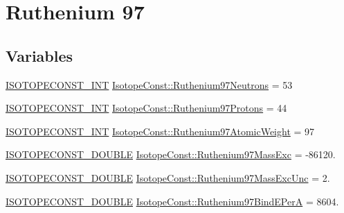 \hypertarget{group___isotope_const-_ruthenium-_ru97}{}\section{Ruthenium 97}
\label{group___isotope_const-_ruthenium-_ru97}
\subsection*{Variables}
\begin{DoxyCompactItemize}
\item 
\mbox{\hyperlink{group___isotope_const-_macros_ga5f18360b3e99483a35c32d789e62621c}{I\+S\+O\+T\+O\+P\+E\+C\+O\+N\+S\+T\+\_\+\+I\+NT}} \mbox{\hyperlink{group___isotope_const-_ruthenium-_ru97_gacc95b6599f6ca56bff7f4cbfee9d2d5e}{Isotope\+Const\+::\+Ruthenium97\+Neutrons}} = 53
\item 
\mbox{\hyperlink{group___isotope_const-_macros_ga5f18360b3e99483a35c32d789e62621c}{I\+S\+O\+T\+O\+P\+E\+C\+O\+N\+S\+T\+\_\+\+I\+NT}} \mbox{\hyperlink{group___isotope_const-_ruthenium-_ru97_ga5a07b188bf93f142f274689b2d40ed14}{Isotope\+Const\+::\+Ruthenium97\+Protons}} = 44
\item 
\mbox{\hyperlink{group___isotope_const-_macros_ga5f18360b3e99483a35c32d789e62621c}{I\+S\+O\+T\+O\+P\+E\+C\+O\+N\+S\+T\+\_\+\+I\+NT}} \mbox{\hyperlink{group___isotope_const-_ruthenium-_ru97_ga07e716ccc0f5b5ea467e4dd254349cdb}{Isotope\+Const\+::\+Ruthenium97\+Atomic\+Weight}} = 97
\item 
\mbox{\hyperlink{group___isotope_const-_macros_ga8f45a7272ce02c0b4c65c44636ed719a}{I\+S\+O\+T\+O\+P\+E\+C\+O\+N\+S\+T\+\_\+\+D\+O\+U\+B\+LE}} \mbox{\hyperlink{group___isotope_const-_ruthenium-_ru97_ga9ce2fe0edf787d1e23e343de329cdbac}{Isotope\+Const\+::\+Ruthenium97\+Mass\+Exc}} = -\/86120.
\item 
\mbox{\hyperlink{group___isotope_const-_macros_ga8f45a7272ce02c0b4c65c44636ed719a}{I\+S\+O\+T\+O\+P\+E\+C\+O\+N\+S\+T\+\_\+\+D\+O\+U\+B\+LE}} \mbox{\hyperlink{group___isotope_const-_ruthenium-_ru97_gac3a6810c4ce49b0c40ad4a3a93a735e5}{Isotope\+Const\+::\+Ruthenium97\+Mass\+Exc\+Unc}} = 2.
\item 
\mbox{\hyperlink{group___isotope_const-_macros_ga8f45a7272ce02c0b4c65c44636ed719a}{I\+S\+O\+T\+O\+P\+E\+C\+O\+N\+S\+T\+\_\+\+D\+O\+U\+B\+LE}} \mbox{\hyperlink{group___isotope_const-_ruthenium-_ru97_ga8d8203965b446fe0b77517a12f6079dd}{Isotope\+Const\+::\+Ruthenium97\+Bind\+E\+PerA}} = 8604.
\item 

\end{DoxyCompactItemize}
